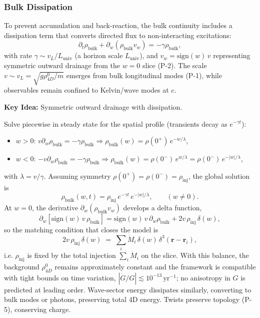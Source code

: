 \subsubsection{Bulk Dissipation}
To prevent accumulation and back-reaction, the bulk continuity includes a dissipation term that converts directed flux to non-interacting excitations:
\begin{equation}
\partial_t \rho_{\text{bulk}} + \partial_w (\rho_{\text{bulk}} v_w) = -\gamma \rho_{\text{bulk}},
\end{equation}
with rate $\gamma \sim v_L/L_{\text{univ}}$ (a horizon scale $L_{\text{univ}}$), and $v_w=\mathrm{sign}(w)\,v$ representing symmetric outward drainage from the $w=0$ slice (P-2). The scale $v \sim v_L=\sqrt{g\rho_{4D}^0/m}$ emerges from bulk longitudinal modes (P-1), while observables remain confined to Kelvin/wave modes at $c$.

\textbf{Key Idea:} Symmetric outward drainage with dissipation.

Solve piecewise in steady state for the spatial profile (transients decay as $e^{-\gamma t}$):
\begin{itemize}
\item $w>0$: $v\partial_w\rho_{\text{bulk}}=-\gamma\rho_{\text{bulk}}\Rightarrow \rho_{\text{bulk}}(w)=\rho(0^+)\,e^{-w/\lambda}$,
\item $w<0$: $-v\partial_w\rho_{\text{bulk}}=-\gamma\rho_{\text{bulk}}\Rightarrow \rho_{\text{bulk}}(w)=\rho(0^-)\,e^{w/\lambda}=\rho(0^-)\,e^{-|w|/\lambda}$,
\end{itemize}
with $\lambda=v/\gamma$. Assuming symmetry $\rho(0^+)=\rho(0^-)=\rho_{\text{inj}}$, the global solution is
\begin{equation}
\rho_{\text{bulk}}(w,t)=\rho_{\text{inj}}\,e^{-\gamma t}\,e^{-|w|/\lambda},\qquad (w\neq 0).
\end{equation}
At $w=0$, the derivative $\partial_w(\rho_{\text{bulk}} v_w)$ develops a delta function,
\begin{equation}
\partial_w\!\left[\mathrm{sign}(w)\,v\,\rho_{\text{bulk}}\right]
= \mathrm{sign}(w)\,v\,\partial_w\rho_{\text{bulk}} + 2v\,\rho_{\text{inj}}\,\delta(w),
\end{equation}
so the matching condition that closes the model is
\begin{equation}
2v\,\rho_{\text{inj}}\,\delta(w)\;=\;\sum_i \dot M_i\,\delta(w)\,\delta^3(\mathbf r-\mathbf r_i),
\end{equation}
i.e. $\rho_{\text{inj}}$ is fixed by the total injection $\sum_i\dot M_i$ on the slice. With this balance, the background $\rho_{4D}^0$ remains approximately constant and the framework is compatible with tight bounds on time variation, $|\dot G/G|\lesssim 10^{-13}\,\mathrm{yr}^{-1}$; no anisotropy in $G$ is predicted at leading order. Wave-sector energy dissipates similarly, converting to bulk modes or photons, preserving total 4D energy. Twists preserve topology (P-5), conserving charge.

